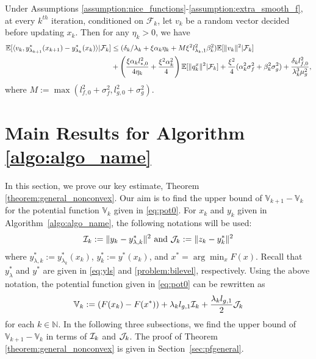 \begin{lemma}
    \label{lemma:y_star_lambda_vdot_bound}
    Under Assumptions \ref{assumption:nice_functions}-\ref{assumption:extra_smooth_f}, at every $k^{th}$ iteration, conditioned on $\mathcal{F}_k$, let $v_k$ be a random vector decided before updating $x_k$. Then for any $\eta_k > 0$, we have
    \begin{align*}
        \mathbb{E}[\langle v_k, y_{\lambda_{k+1}}^*(x_{k+1}) - y_{\lambda_k}^*(x_k) \rangle | \mathcal{F}_k ] &\le (\delta_k/\lambda_k + \xi \alpha_k \eta_k + M \xi^2 l_{\lambda_k,1}^2 \beta_k^2) \mathbb{E}[\|v_k\|^2 | \mathcal{F}_k] \\
        &+ \left(\frac{\xi \alpha_k l_{*,0}^2}{4\eta_k} + \frac{\xi^2 \alpha_k^2}{4}\right) \mathbb{E}[\|q_k^x\|^2 | \mathcal{F}_k] + \frac{\xi^2}{4} (\alpha_k^2 \sigma_f^2 + \beta_k^2 \sigma_g^2) + \frac{\delta_k l_{f,0}^2}{\lambda_k^3 \mu_g^2},
    \end{align*}
    where $M := \max\left(l_{f,0}^2 + \sigma_f^2, l_{g,0}^2 + \sigma_g^2\right)$.
\end{lemma}

\section{Main Results for Algorithm \ref{algo:algo_name}}
\label{appendix:main_proof_non_convex}

In this section, we prove our key estimate, Theorem \ref{theorem:general_nonconvex}. Our aim is to find the upper bound of  $\mathbb{V}_{k+1} - \mathbb{V}_k$ for the potential function $\mathbb{V}_k$ given in \eqref{eq:pot0}. For $x_k$ and $y_k$ given in Algorithm~\ref{algo:algo_name}, the following notations will be used:
\begin{align}
\label{eq:ikjk}
    \mathcal{I}_k := \|y_k - y_{\lambda,k}^*\|^2 \hbox{ and } \mathcal{J}_k := \|z_k - y_k^*\|^2
\end{align}
where $y_{\lambda,k}^* := y_{\lambda_k}^*(x_k)$, $y_k^* := y^*(x_k)$, and $x^* = \arg \min_x F(x)$. Recall that $y^*_{\lambda}$ and $y^*$ are given in \eqref{eq:yls} and \eqref{problem:bilevel}, respectively.
Using the above notation, the potential function given in \eqref{eq:pot0} can be rewritten as  \begin{align}
\label{eq:pot}
    \mathbb{V}_k := (F(x_k) - F(x^*)) + \lambda_k l_{g,1} \mathcal{I}_k + \frac{\lambda_k l_{g,1}}{2} \mathcal{J}_k
\end{align}
for each $k \in \mathbb{N}$. In the following three subsections, we find the upper bound of $\mathbb{V}_{k+1} - \mathbb{V}_k$ in terms of $\mathcal{I}_k$ and $\mathcal{J}_k$. The proof of Theorem \ref{theorem:general_nonconvex} is given in Section~\ref{sec:pfgeneral}.

